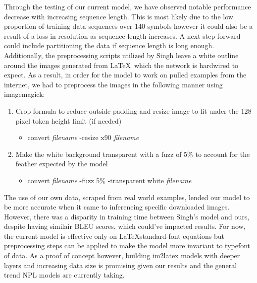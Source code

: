 \documentclass[12pt]{article}
\begin{document}
Through the testing of our current model, we have observed notable performance
decrease with increasing sequence length. This is most likely due to the low
proportion of training data sequences over 140 symbols however it could also be
a result of a loss in resolution as sequence length increases. A next step
forward could include partitioning the data if sequence length is long enough.
Additionally, the preprocessing scripts utilized by Singh
\parencite{singh2018teaching} leave a white outline around the images generated
from \LaTeX\ which the network is hardwired to expect. As a result, in order for
the model to work on pulled examples from the internet, we had to preprocess the
images in the following manner using imagemagick:
\begin{enumerate}
  \item Crop formula to reduce outside padding and resize image to fit under the
  128 pixel token height limit (if needed)
  \begin{itemize}
    \item convert \textit{filename} -resize x90 \textit{filename}
  \end{itemize}
  \item Make the white background transparent with a fuzz of 5\% to account for
  the feather expected by the model
  \begin{itemize}
    \item convert \textit{filename} -fuzz 5\% -transparent white \textit{filename}
  \end{itemize} 
\end{enumerate}
The use of our own data, scraped from real world examples, lended our model to
be more accurate when it came to inferencing specific downloaded images.
However, there was a disparity in training time between Singh's model and ours,
despite having similair BLEU scores, which could've impacted results. For now,
the current model is effective only on \LaTeX standard-font equations but
preprocessing steps can be applied to make the model more invariant to typefont
of data. As a proof of concept however, building im2latex models with deeper
layers and increasing data size is promising given our results and the general
trend NPL models are currently taking.


\printbibliography{}
\end{document}

